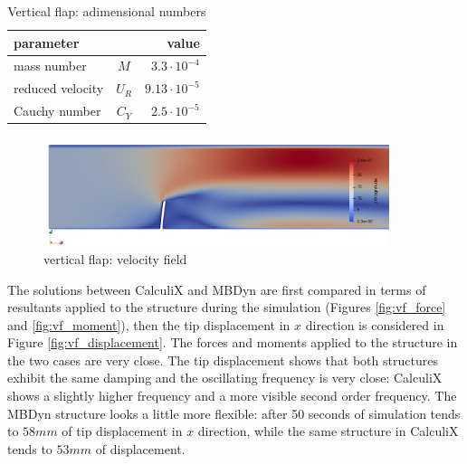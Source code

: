 \begin{table}[!htb]
	\begin{center}
		\begin{tabular}{ l c | r } 
			parameter & & value   \\ 
			\hline
			mass number  & $M$ & $3.3\cdot 10^{-4}$     \\
			reduced velocity & $U_R$ & $9.13\cdot 10^{-5}$  \\
			Cauchy number  & $C_Y$ & $2.5\cdot 10^{-5}$  \\			
		\end{tabular}
	\end{center}
	\caption{Vertical flap: adimensional numbers}
	\label{table:ex1-adim}
\end{table}

\begin{figure}[htbp!]
	\centering
	\includegraphics[width=0.9\textwidth]{images/vert_flap/vert_flap1.png}
	\caption{vertical flap: velocity field}
	\label{fig:vf_sol}
\end{figure}


The solutions between CalculiX and MBDyn are first compared in terms of resultants applied to the structure during the simulation (Figures \ref{fig:vf_force} and \ref{fig:vf_moment}), then the tip displacement in $x$ direction is considered in Figure \ref{fig:vf_displacement}. The forces and moments applied to the structure in the two cases are very close. 
The tip displacement shows that both structures exhibit the same damping and the oscillating frequency is very close: CalculiX shows a slightly higher frequency and a more visible second order frequency. The MBDyn structure looks a little more flexible: after 50 seconds of simulation tends to $58mm$ of tip displacement in $x$ direction, while the same structure in CalculiX tends to $53mm$ of displacement. 

